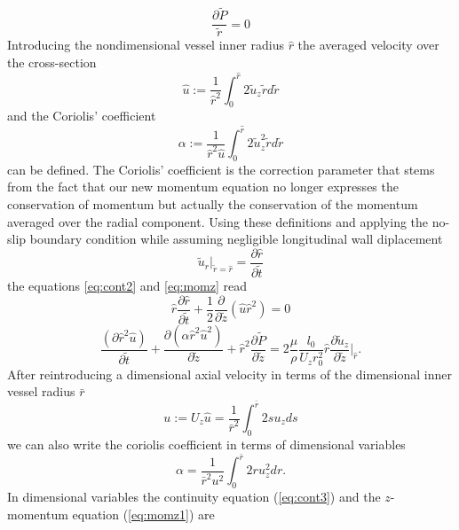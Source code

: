 \documentclass[a4paper, oneside]{discothesis}
\begin{document}
\begin{equation}
	\frac{\partial \tilde{P}}{\tilde{r}} = 0
\end{equation}
Introducing the nondimensional vessel inner radius $\hat r$ the averaged velocity over the cross-section
\begin{equation}
\hat{u} := \frac{1}{\hat{r}^2} \int_0^{\hat{r}} 2 \tilde{u}_z \tilde{r} d\tilde{r}
\end{equation}
and the Coriolis' coefficient
\begin{equation}
	\alpha := \frac{1}{\hat{r}^2 \hat{u}} \int_0^{\hat{r}} 2 \tilde{u}_z^2 \tilde{r} d\tilde{r}
\end{equation}
can be defined.
The Coriolis' coefficient is the correction parameter that stems from the fact that our new momentum equation no longer expresses the conservation of momentum but actually the conservation of the momentum averaged over the radial component.\cite{article10002407}
Using these definitions and applying the no-slip boundary condition while assuming negligible longitudinal wall diplacement
\begin{equation}
	\tilde{u}_r|_{\tilde{r}=\hat{r}} = \frac{\partial \hat{r}}{\partial \tilde{t}}
\end{equation}
the equations \autoref{eq:cont2} and \autoref{eq:momz} read
\begin{equation}
	\hat{r} \frac{\partial \hat{r}}{\partial \tilde{t}} + \frac{1}{2}\frac{\partial}{\partial \tilde{z}} \left(  \hat{u}\hat{r}^2 \right) = 0 \label{eq:cont3}
\end{equation}
\begin{equation}
	\frac{(\partial \hat{r}^2 \hat{u})}{\partial \tilde{t}} + \frac{\partial \left( \alpha \hat{r}^2 \hat{u}^2 \right)}{\partial \tilde{z}} + \hat{r}^2 \frac{\partial \tilde{P}}{\partial \tilde{z}} = 2\frac{\mu}{\rho} \frac{l_0}{U_z r_0^2} \hat{r} \frac{\partial \tilde{u}_z}{\partial \tilde{z}} |_{\hat{r}}.\label{eq:momz1}
\end{equation}
After reintroducing a dimensional axial velocity in terms of the dimensional inner vessel radius $\bar{r}$
\begin{equation}
	u := U_z \hat{u} = \frac{1}{\bar{r}^2} \int_0^{\bar{r}} 2su_zds
\end{equation}
we can also write the coriolis coefficient in terms of dimensional variables
\begin{equation}
\alpha = \frac{1}{\bar{r}^2 u^2} \int_0^{\bar{r}} 2ru_z^2dr.
\end{equation}
In dimensional variables the continuity equation (\autoref{eq:cont3}) and the $z$-momentum equation (\autoref{eq:momz1}) are
\end{document}

